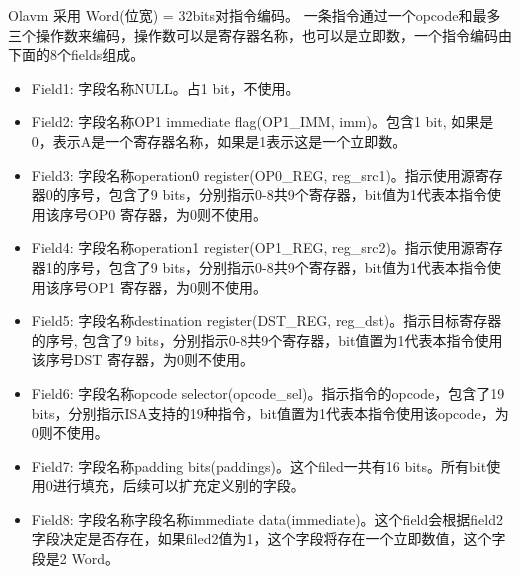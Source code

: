 Olavm 采用 Word(位宽) = 32bits对指令编码。
一条指令通过一个opcode和最多三个操作数来编码，操作数可以是寄存器名称，也可以是立即数，一个指令编码由下面的8个fields组成。
\begin{itemize}
    \item Field1: 字段名称NULL。占1 bit，不使用。
    \item Field2: 字段名称OP1 immediate flag(OP1\_IMM, imm)。包含1 bit, 如果是0，表示A是一个寄存器名称，如果是1表示这是一个立即数。
    \item Field3: 字段名称operation0 register(OP0\_REG, reg\_src1)。指示使用源寄存器0的序号，包含了9 bits，分别指示0-8共9个寄存器，bit值为1代表本指令使用该序号OP0 寄存器，为0则不使用。
    \item Field4: 字段名称operation1 register(OP1\_REG, reg\_src2)。指示使用源寄存器1的序号，包含了9 bits，分别指示0-8共9个寄存器，bit值为1代表本指令使用该序号OP1 寄存器，为0则不使用。
    \item Field5: 字段名称destination register(DST\_REG, reg\_dst)。指示目标寄存器的序号, 包含了9 bits，分别指示0-8共9个寄存器，bit值置为1代表本指令使用该序号DST 寄存器，为0则不使用。
    \item Field6: 字段名称opcode selector(opcode\_sel)。指示指令的opcode，包含了19 bits，分别指示ISA支持的19种指令，bit值置为1代表本指令使用该opcode，为0则不使用。
    \item Field7: 字段名称padding bits(paddings)。这个filed一共有16 bits。所有bit使用0进行填充，后续可以扩充定义别的字段。
    \item Field8: 字段名称字段名称immediate data(immediate)。这个field会根据field2字段决定是否存在，如果filed2值为1，这个字段将存在一个立即数值，这个字段是2 Word。
\end{itemize}

